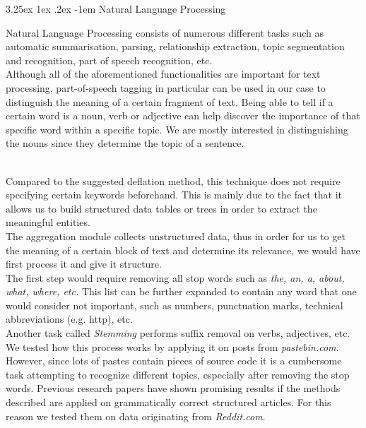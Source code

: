 \documentclass[12pt]{article}
\makeatletter
\renewcommand\paragraph{\@startsection{paragraph}{5}{\z@}%
  {3.25ex \@plus1ex \@minus.2ex}%
  {-1em}%
  {\normalfont\normalsize\bfseries}}
\makeatother
\begin{document}
\paragraph{Natural Language Processing}
\hfill \break\\
\parbox{\linewidth}{
Natural Language Processing consists of numerous different tasks such as automatic summarisation, parsing, relationship extraction, topic segmentation and recognition, part of speech recognition, etc.
\hfill \break
\\
Although all of the aforementioned functionalities are important for text processing, part-of-speech tagging in particular can be used in our case to distinguish the meaning of a certain fragment of text. Being able to tell if a certain word is a noun, verb or adjective can help discover the importance of that specific word within a specific topic.  We are mostly interested in distinguishing the nouns since they determine the topic of a sentence.}
\hfill \break
\\
Compared to the suggested deflation method, this technique does not require specifying certain keywords beforehand. This is mainly due to the fact that it allows us to build structured data tables or trees in order to extract the meaningful entities. 
\hfill \break
\\
The aggregation module collects unstructured data, thus in order for us to get the meaning of a certain block of text and determine its relevance, we would have first process it and give it structure. 
\hfill \break
\\
The first step would require removing all stop words such as \textit{the, an, a, about, what, where, etc.} This list can be further expanded to contain any word that one would consider not important, such as numbers, punctuation marks, technical abbreviations (e.g. http), etc.
\hfill \break
\\
Another task called \textit{Stemming} performs suffix removal on verbs, adjectives, etc. 
\hfill \break
\\
We tested how this process works by applying it on posts from \textit{pastebin.com}. However, since lots of pastes contain pieces of source code it is a cumbersome task attempting to recognize different topics, especially after removing the stop words. Previous research papers \cite{second} have shown promising results if the methods described are applied on grammatically correct structured articles. For this reason we tested them on data originating from \textit{Reddit.com}.
\end{document}
